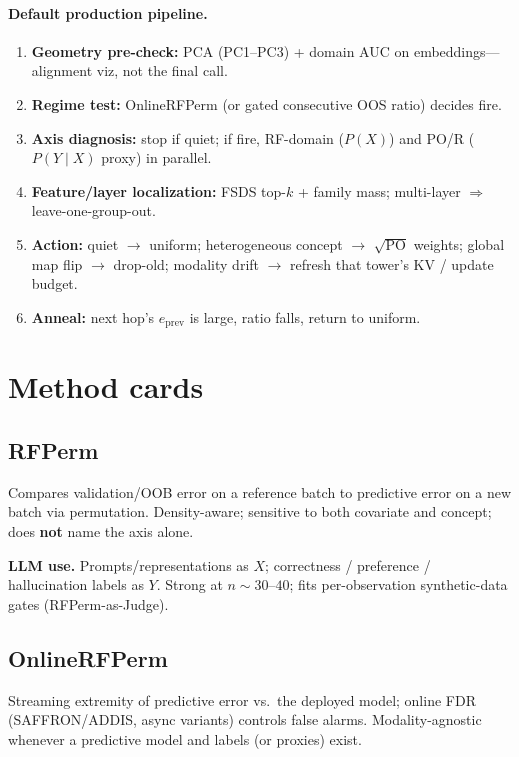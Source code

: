 \documentclass[11pt,a4paper]{article}
\begin{document}
\paragraph{Default production pipeline.}
\begin{enumerate}
  \item \textbf{Geometry pre-check:} PCA (PC1--PC3) + domain AUC on embeddings---alignment viz, not the final call.
  \item \textbf{Regime test:} OnlineRFPerm (or gated consecutive OOS ratio) decides fire.
  \item \textbf{Axis diagnosis:} stop if quiet; if fire, RF-domain (\(P(X)\)) and PO/R (\(P(Y\mid X)\) proxy) in parallel.
  \item \textbf{Feature/layer localization:} FSDS top-\(k\) + family mass; multi-layer \(\Rightarrow\) leave-one-group-out.
  \item \textbf{Action:} quiet \(\to\) uniform; heterogeneous concept \(\to\) \(\sqrt{\mathrm{PO}}\) weights; global map flip \(\to\) drop-old; modality drift \(\to\) refresh that tower's KV / update budget.
  \item \textbf{Anneal:} next hop's \(e_{\mathrm{prev}}\) is large, ratio falls, return to uniform.
\end{enumerate}

\section{Method cards}
\label{sec:cards}

\subsection{RFPerm}
Compares validation/OOB error on a reference batch to predictive error on a new batch via permutation. Density-aware; sensitive to both covariate and concept; does \textbf{not} name the axis alone.

\textbf{LLM use.} Prompts/representations as \(X\); correctness / preference / hallucination labels as \(Y\). Strong at \(n\sim 30\)--\(40\); fits per-observation synthetic-data gates (RFPerm-as-Judge).

\subsection{OnlineRFPerm}
Streaming extremity of predictive error vs.\ the deployed model; online FDR (SAFFRON/ADDIS, async variants) controls false alarms. Modality-agnostic whenever a predictive model and labels (or proxies) exist.
\end{document}
